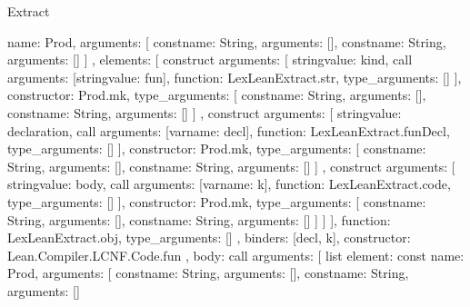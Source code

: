 \begin{lexlean}{Extract}
\begin{toolingmodule}
{{{{{{{                    name: Prod,
                    arguments: [
                      const{name: String, arguments: []},
                      const{name: String, arguments: []}
                    ]
                  },
                  elements: [
                    construct{
                      arguments: [
                        string{value: kind},
                        call{
                          arguments: [string{value: fun}],
                          function: LexLeanExtract.str,
                          type_arguments: []
                        }
                      ],
                      constructor: Prod.mk,
                      type_arguments: [
                        const{name: String, arguments: []},
                        const{name: String, arguments: []}
                      ]
                    },
                    construct{
                      arguments: [
                        string{value: declaration},
                        call{
                          arguments: [var{name: decl}],
                          function: LexLeanExtract.funDecl,
                          type_arguments: []
                        }
                      ],
                      constructor: Prod.mk,
                      type_arguments: [
                        const{name: String, arguments: []},
                        const{name: String, arguments: []}
                      ]
                    },
                    construct{
                      arguments: [
                        string{value: body},
                        call{
                          arguments: [var{name: k}],
                          function: LexLeanExtract.code,
                          type_arguments: []
                        }
                      ],
                      constructor: Prod.mk,
                      type_arguments: [
                        const{name: String, arguments: []},
                        const{name: String, arguments: []}
                      ]
                    }
                  ]
                }
              ],
              function: LexLeanExtract.obj,
              type_arguments: []
            },
            binders: [decl, k],
            constructor: Lean.Compiler.LCNF.Code.fun
          },
          {
            body: call{
              arguments: [
                list{
                  element: const{
                    name: Prod,
                    arguments: [
                      const{name: String, arguments: []},
                      const{name: String, arguments: []}
}}}}}}}
\end{toolingmodule}
\end{lexlean}
